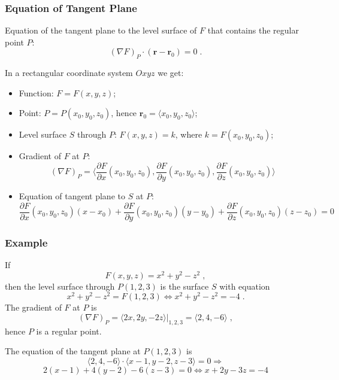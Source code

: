 \begin{frame}
  \frametitle{Equation of Tangent Plane}

Equation of the tangent plane to the level surface of $F$ that contains the regular point $P$:
%
$$(\nabla F)_P \cdot (\textbf{r}-\textbf{r}_0) = 0\; .$$

\pause
In a rectangular coordinate system $Oxyz$ we get:

\begin{itemize}
  \item Function: $F = F(x,y,z)$;
  \item Point: $P=P(x_0,y_0,z_0)$, hence $\textbf{r}_0 = \langle x_0, y_0 , z_0 \rangle$;
  \item Level surface $S$ through $P$: $F(x,y,z) = k$, where $k = F(x_0,y_0,z_0)$;
  \item \pause Gradient of $F$ at $P$:
  $$(\nabla F)_P = \langle \frac{\partial F}{\partial x}(x_0,y_0,z_0), \frac{\partial F}{\partial y}(x_0,y_0,z_0), \frac{\partial F}{\partial z}(x_0,y_0,z_0) \rangle$$
  \item \pause Equation of tangent plane to $S$ at $P$:
  $$\frac{\partial F}{\partial x}(x_0,y_0,z_0)(x-x_0) + \frac{\partial F}{\partial y}(x_0,y_0,z_0) (y-y_0) + \frac{\partial F}{\partial z}(x_0,y_0,z_0)(z-z_0) = 0$$
\end{itemize}
\end{frame}

\begin{frame}
  \frametitle{Example}
  If
  $$F(x,y,z) = x^2 + y^2-z^2 \; ,$$
  then the level surface through $P(1,2,3)$ is the surface $S$ with equation
%
$$x^2+y^2 -z^2 = F(1,2,3) \Longleftrightarrow x^2+y^2 -z^2 = -4 \; .$$
%
\pause The gradient of $F$ at $P$ is \pause
%
$$(\nabla F)_P = \left. \langle 2x, 2y, -2z \rangle \right|_{1,2,3} = \langle 2,4,-6 \rangle \; ,$$
%
\pause hence $P$ is a regular point.

\pause The equation of the tangent plane at $P(1,2,3)$ is\pause
%
$$\langle 2,4,-6 \rangle \cdot \langle x-1, y-2, z-3\rangle = 0 \Longrightarrow$$
%
$$2(x-1) + 4(y-2) -6(z-3) = 0  \Longleftrightarrow x+2y-3z=-4$$
\end{frame}

